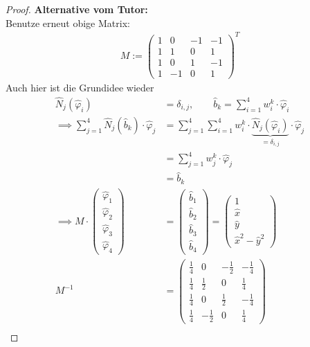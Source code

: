 \begin{proof}
	\textbf{Alternative vom Tutor:}\\
	Benutze erneut obige Matrix:
	\begin{align*}
		M:=\begin{pmatrix}
			1 & 0 & -1 & -1\\
			1 & 1 & 0 & 1\\
			1 & 0 & 1 & -1\\
			1 & -1 & 0 & 1
		\end{pmatrix}^T
	\end{align*}
	Auch hier ist die Grundidee wieder 
	\begin{align*}
		\hat{N}_j(\hat{\varphi}_i)&=\delta_{i,j},\qquad
		\hat{b}_k=\sum\limits_{i=1}^4 w_i^k\cdot\hat{\varphi}_i\\
		\implies
		\sum\limits_{j=1}^4\hat{N}_j(\hat{b}_k)\cdot\hat{\varphi}_j
		&=\sum\limits_{j=1}^4\sum\limits_{i=1}^4 w_i^k\cdot\underbrace{\hat{N}_j(\hat{\varphi}_i)}_{=\delta_{i,j}}\cdot\hat{\varphi}_j\\
		&=\sum\limits_{j=1}^4 w_j^k\cdot\hat{\varphi}_j\\
		&=\hat{b}_k\\
		\implies
		M\cdot\begin{pmatrix}
			\hat{\varphi}_1\\ 
			\hat{\varphi}_2 \\ 
			\hat{\varphi}_3 \\ 
			\hat{\varphi}_4
		\end{pmatrix}
		&=\begin{pmatrix}
			\hat{b}_1\\ 
			\hat{b}_2 \\ 
			\hat{b}_3 \\ 
			\hat{b}_4
		\end{pmatrix}
		=\begin{pmatrix}
			1\\ 
			\hat{x} \\ 
			\hat{y} \\
			\hat{x}^2-\hat{y}^2
		\end{pmatrix}\\
		M^{-1}&=\begin{pmatrix}
			\frac{1}{4} & 0 & -\frac{1}{2} & -\frac{1}{4}\\
			\frac{1}{4} & \frac{1}{2} & 0 & \frac{1}{4}\\
			\frac{1}{4} & 0 & \frac{1}{2} & -\frac{1}{4}\\
			\frac{1}{4} & -\frac{1}{2} & 0 & \frac{1}{4}
		\end{pmatrix}\\

\end{align*}
\end{proof}
